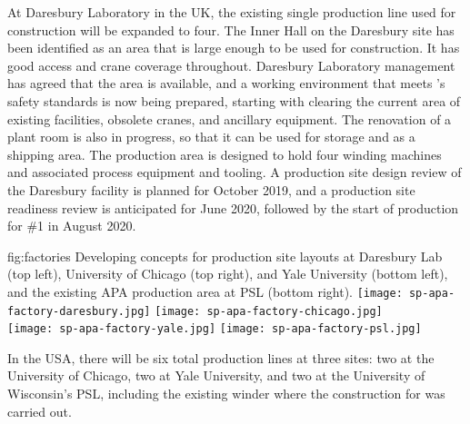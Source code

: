 At Daresbury Laboratory in the UK, the existing single production line used for  construction will be expanded to four.  The Inner Hall on the Daresbury site has been identified as an area that is large enough to be used for   construction. It has good access and crane coverage throughout. Daresbury Laboratory management has agreed that the area is available, and a working environment that meets 's safety standards is now being prepared, starting with clearing the current area of existing facilities, obsolete cranes, and ancillary equipment. The renovation of a plant room is also in progress, so that it can be used for storage and as a shipping area. The production area is designed to hold four winding machines and associated process equipment and tooling.  A production site design review of the Daresbury facility is planned for October 2019, and a production site readiness review is anticipated for June 2020, followed by the start of  production for   \#1 in August 2020.  


\begin{dunefigure}{fig:factories}
{Developing concepts for production site layouts at Daresbury Lab (top left), University of Chicago (top right), and Yale University (bottom left), and the existing APA production area at PSL (bottom right).}
\texttt{[image: sp-apa-factory-daresbury.jpg]} 
\texttt{[image: sp-apa-factory-chicago.jpg]} \\
\vspace{1mm}
\texttt{[image: sp-apa-factory-yale.jpg]}
\texttt{[image: sp-apa-factory-psl.jpg]} 
\end{dunefigure}

In the USA, there will be six total production lines at three sites: two at the University of Chicago, two at Yale University, and two at the University of Wisconsin's PSL, including the existing winder where the construction for  was carried out. 

